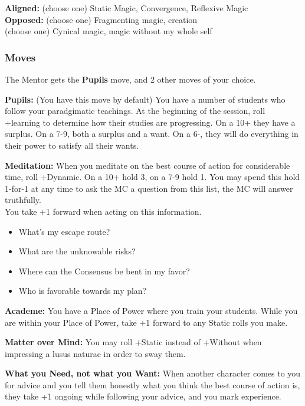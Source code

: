 \documentclass[
]{article}
\providecommand{\tightlist}{%
  \setlength{\itemsep}{0pt}\setlength{\parskip}{0pt}}
\begin{document}
\textbf{Aligned:} (choose one) Static Magic, Convergence, Reflexive
Magic\\
\textbf{Opposed:} (choose one) Fragmenting magic, creation\\
(choose one) Cynical magic, magic without my whole self

\hypertarget{moves-1}{%
\subsubsection{Moves}\label{moves-1}}

The Mentor gets the \textbf{Pupils} move, and 2 other moves of your
choice.

\textbf{Pupils:} (You have this move by default) You have a number of
students who follow your paradgimatic teachings. At the beginning of the
session, roll +learning to determine how their studies are progressing.
On a 10+ they have a surplus. On a 7-9, both a surplus and a want. On a
6-, they will do everything in their power to satisfy all their wants.

\textbf{Meditation:} When you meditate on the best course of action for
considerable time, roll +Dynamic. On a 10+ hold 3, on a 7-9 hold 1. You
may spend this hold 1-for-1 at any time to ask the MC a question from
this list, the MC will answer truthfully.\\
You take +1 forward when acting on this information.

\begin{itemize}
\tightlist
\item
  What's my escape route?
\item
  What are the unknowable risks?
\item
  Where can the Consensus be bent in my favor?
\item
  Who is favorable towards my plan?
\end{itemize}

\textbf{Academe:} You have a Place of Power where you train your
students. While you are within your Place of Power, take +1 forward to
any Static rolls you make.

\textbf{Matter over Mind:} You may roll +Static instead of +Without when
impressing a lusus naturae in order to sway them.

\textbf{What you Need, not what you Want:} When another character comes
to you for advice and you tell them honestly what you think the best
course of action is, they take +1 ongoing while following your advice,
and you mark experience.
\end{document}
